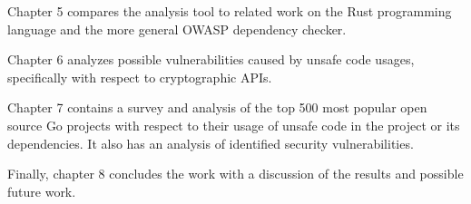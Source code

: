 Chapter 5 compares the analysis tool to related work on the Rust programming language and the
more general OWASP dependency checker.

Chapter 6 analyzes possible vulnerabilities caused by unsafe code usages, specifically with
respect to cryptographic APIs.

Chapter 7 contains a survey and analysis of the top 500 most popular open source Go projects
with respect to their usage of unsafe code in the project or its dependencies. It also has an
analysis of identified security vulnerabilities.

Finally, chapter 8 concludes the work with a discussion of the results and possible future work.